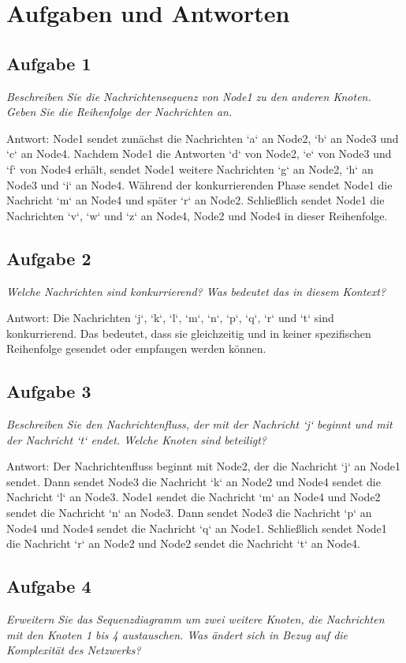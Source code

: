 \documentclass{article}
\begin{document}
\section{Aufgaben und Antworten}

\subsection{Aufgabe 1}
\textit{Beschreiben Sie die Nachrichtensequenz von Node1 zu den anderen Knoten. Geben Sie die Reihenfolge der Nachrichten an.}

Antwort: Node1 sendet zunächst die Nachrichten `a` an Node2, `b` an Node3 und `c` an Node4. Nachdem Node1 die Antworten `d` von Node2, `e` von Node3 und `f` von Node4 erhält, sendet Node1 weitere Nachrichten `g` an Node2, `h` an Node3 und `i` an Node4. Während der konkurrierenden Phase sendet Node1 die Nachricht `m` an Node4 und später `r` an Node2. Schließlich sendet Node1 die Nachrichten `v`, `w` und `z` an Node4, Node2 und Node4 in dieser Reihenfolge.

\subsection{Aufgabe 2}
\textit{Welche Nachrichten sind konkurrierend? Was bedeutet das in diesem Kontext?}

Antwort: Die Nachrichten `j`, `k`, `l`, `m`, `n`, `p`, `q`, `r` und `t` sind konkurrierend. Das bedeutet, dass sie gleichzeitig und in keiner spezifischen Reihenfolge gesendet oder empfangen werden können. 

\subsection{Aufgabe 3}
\textit{Beschreiben Sie den Nachrichtenfluss, der mit der Nachricht `j` beginnt und mit der Nachricht `t` endet. Welche Knoten sind beteiligt?}

Antwort: Der Nachrichtenfluss beginnt mit Node2, der die Nachricht `j` an Node1 sendet. Dann sendet Node3 die Nachricht `k` an Node2 und Node4 sendet die Nachricht `l` an Node3. Node1 sendet die Nachricht `m` an Node4 und Node2 sendet die Nachricht `n` an Node3. Dann sendet Node3 die Nachricht `p` an Node4 und Node4 sendet die Nachricht `q` an Node1. Schließlich sendet Node1 die Nachricht `r` an Node2 und Node2 sendet die Nachricht `t` an Node4. 

\subsection{Aufgabe 4}
\textit{Erweitern Sie das Sequenzdiagramm um zwei weitere Knoten, die Nachrichten mit den Knoten 1 bis 4 austauschen. Was ändert sich in Bezug auf die Komplexität des Netzwerks?}
\end{document}
